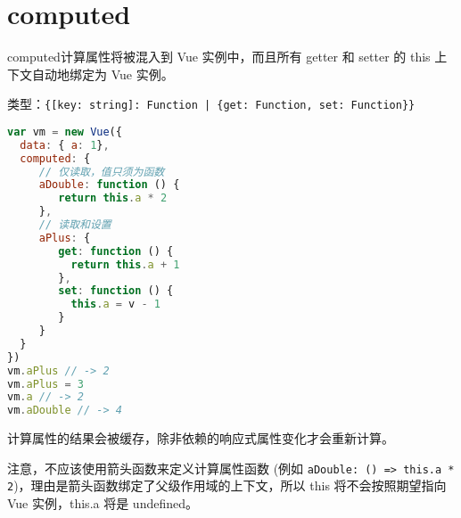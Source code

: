\begin{lstlisting}[language=JavaScript]

\end{lstlisting}




\begin{lstlisting}[language=JavaScript]

\end{lstlisting}




\begin{lstlisting}[language=JavaScript]

\end{lstlisting}






\section{computed}

computed计算属性将被混入到 Vue 实例中，而且所有 getter 和 setter 的 this 上下文自动地绑定为 Vue 实例。

\begin{compactitem}
\item 类型：\texttt{\{[key: string]: Function | \{get: Function, set: Function\}\}}
\end{compactitem}






\begin{lstlisting}[language=JavaScript]
var vm = new Vue({
  data: { a: 1},
  computed: {
     // 仅读取，值只须为函数
     aDouble: function () {
        return this.a * 2
     },
     // 读取和设置
     aPlus: {
        get: function () {
          return this.a + 1
        },
        set: function () {
          this.a = v - 1
        }
     }
  }
})
vm.aPlus // -> 2
vm.aPlus = 3
vm.a // -> 2
vm.aDouble // -> 4
\end{lstlisting}


计算属性的结果会被缓存，除非依赖的响应式属性变化才会重新计算。



注意，不应该使用箭头函数来定义计算属性函数 (例如 \texttt{aDouble: () => this.a * 2})，理由是箭头函数绑定了父级作用域的上下文，所以 this 将不会按照期望指向 Vue 实例，this.a 将是 undefined。




\begin{lstlisting}[language=JavaScript]

\end{lstlisting}




